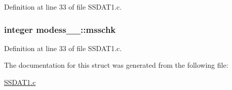 Definition at line 33 of file S\+S\+D\+A\+T1.\+c.

\subsubsection[{\texorpdfstring{msschk}{msschk}}]{\setlength{\rightskip}{0pt plus 5cm}integer modess\+\_\+\_\+\+::msschk}\hypertarget{structmodess__1___a8657ec388a0cdc37d25944e1e89df035}{}\label{structmodess__1___a8657ec388a0cdc37d25944e1e89df035}


Definition at line 33 of file S\+S\+D\+A\+T1.\+c.



The documentation for this struct was generated from the following file\+:\begin{DoxyCompactItemize}
\item 
\hyperlink{SSDAT1_8c}{S\+S\+D\+A\+T1.\+c}\end{DoxyCompactItemize}
